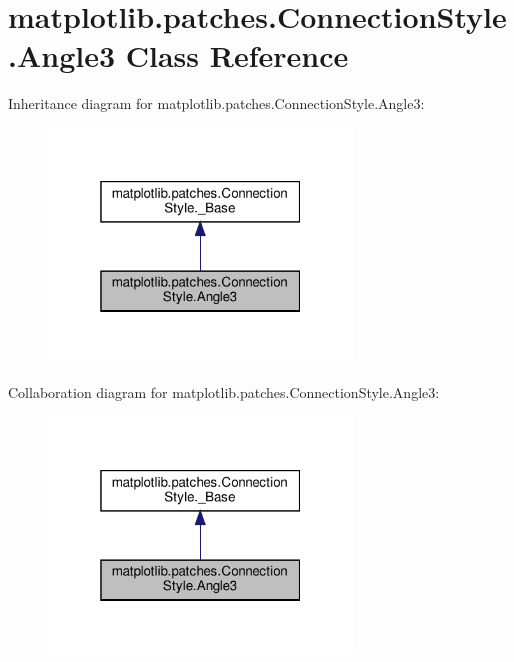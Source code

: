 \hypertarget{classmatplotlib_1_1patches_1_1ConnectionStyle_1_1Angle3}{}\section{matplotlib.\+patches.\+Connection\+Style.\+Angle3 Class Reference}
\label{classmatplotlib_1_1patches_1_1ConnectionStyle_1_1Angle3}


Inheritance diagram for matplotlib.\+patches.\+Connection\+Style.\+Angle3\+:
\nopagebreak
\begin{figure}[H]
\begin{center}
\leavevmode
\includegraphics[width=229pt]{classmatplotlib_1_1patches_1_1ConnectionStyle_1_1Angle3__inherit__graph}
\end{center}
\end{figure}


Collaboration diagram for matplotlib.\+patches.\+Connection\+Style.\+Angle3\+:
\nopagebreak
\begin{figure}[H]
\begin{center}
\leavevmode
\includegraphics[width=229pt]{classmatplotlib_1_1patches_1_1ConnectionStyle_1_1Angle3__coll__graph}
\end{center}
\end{figure}

